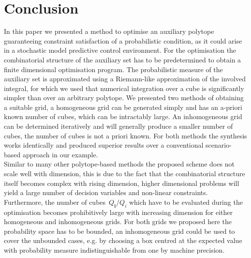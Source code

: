 \documentclass[letterpaper, 10pt, conference]{ieeeconf} %
\providecommand{\bfa}[1]{\mathbf{#1}}
\begin{document}
\section{Conclusion}\label{sec:conclusion}
%
%
%
%
%
\noindent In this paper we presented a method to optimise an auxiliary polytope guaranteeing constraint satisfaction of a probabilistic condition, as it could arise in a stochastic model predictive control environment.
%
For the optimisation the combinatorial structure of the auxiliary set has to be predetermined to obtain a finite dimensional optimisation program.
%
The probabilistic measure of the auxiliary set is approximated using a Riemann-like approximation of the involved integral, for which we used that numerical integration over a cube is significantly simpler than over an arbitrary polytope.
%
We presented two methods of obtaining a suitable grid, a homogeneous grid can be generated simply and has an a-priori known number of cubes, which can be intractably large.
%
An inhomogeneous grid can be determined iteratively and will generally produce a smaller number of cubes, the number of cubes is not a priori known.
%
For both methods the synthesis works identically and produced superior results over a conventional scenario-based approach in our example.
%
\\[1em]
%
Similar to many other polytope-based methods the proposed scheme does not scale well with dimension, this is due to the fact that the combinatorial structure itself becomes complex with rising dimension, higher dimensional problems will yield a large number of decision variables and non-linear constraints.
%
Furthermore, the number of cubes~$Q_\bfa{i}/Q_i$ which have to be evaluated during the optimisation becomes prohibitively large with increasing dimension for either homogeneous and inhomogeneous grids.
%
For both grids we proposed here the probability space has to be bounded, an inhomogeneous grid could be used to cover the unbounded cases, e.g. by choosing a box centred at the expected value with probability measure indistinguishable from one by machine precision.

\printbibliography
\end{document}
